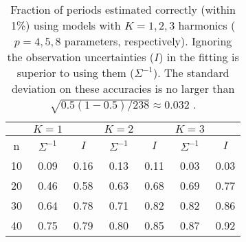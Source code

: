 \begin{table}[ht]
\centering
\begin{tabular}{c|cc|cc|cc}
 &   $K=1$ &    & $K=2$ &    & $K=3$ &  \\ 
  \hline
n & $\Sigma^{-1}$ &  $I$ & $\Sigma^{-1}$ &  $I$ & $\Sigma^{-1}$ &  $I$ \\
  \hline10&0.09&0.16&0.13&0.11&0.03&0.03\\20&0.46&0.58&0.63&0.68&0.69&0.77\\30&0.64&0.78&0.71&0.82&0.82&0.86\\40&0.75&0.79&0.80&0.85&0.87&0.92\\\hline
\end{tabular}
\caption{Fraction of periods estimated correctly (within 1\%) using models with $K=1,2,3$ harmonics ($p=4,5,8$ parameters, respectively). Ignoring the observation uncertainties ($I$) in the fitting is superior to using them ($\Sigma^{-1}$). The standard deviation on these accuracies is no larger than $\sqrt{0.5(1-0.5)/238} \approx 0.032$ .}
\label{tab:period_est_results}
\end{table}
